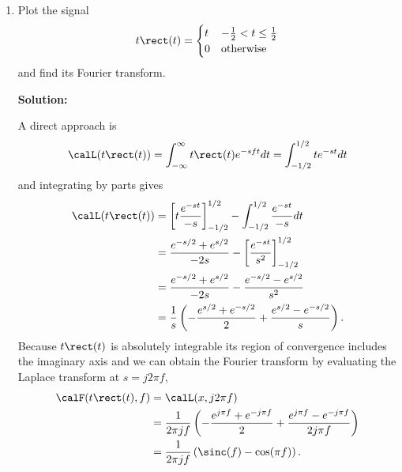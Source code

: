 \documentclass[11pt,a4paper]{book}
\theoremstyle{plain}
\numberwithin{equation}{section}
\newcommand{\vtick}[1]{\draw (#1,-0.075) -- (#1,0.075) }
\newcommand{\htick}[1]{\draw (-0.075,#1) -- (0.075,#1)}
\newenvironment{solution}{\begin{footnotesize}\textbf{Solution:}}{\end{footnotesize}}
\newenvironment{excersizelist}{%
  \renewcommand*{\theenumi}{\thechapter.\arabic{enumi}}%
  \newcommand\itemadvanced{\stepcounter{enumi}\item[$\ast$\, \theenumi.]}
  \begin{enumerate}
}{%
  \end{enumerate}
}
\begin{document}
\begin{excersizelist}
\item Plot the signal
\[
t\rect(t) = \begin{cases}
t & -\tfrac{1}{2} < t \leq \tfrac{1}{2} \\
0 & \text{otherwise}
\end{cases}
\] 
and find its Fourier transform.
\begin{solution}
\begin{center}
\end{center}

A direct approach is
\[
\calL( t \rect(t) ) = \int_{-\infty}^\infty t \rect(t) e^{-s f t} dt = \int_{-1/2}^{1/2} t e^{-s t} dt 
\]
and integrating by parts gives
\begin{align*}
\calL( t \rect(t) ) &= \left[ t \frac{e^{-s t}}{-s} \right]_{-1/2}^{1/2}  - \int_{-1/2}^{1/2} \frac{e^{-s t}}{-s}  dt \\
&= \frac{e^{-s/2} + e^{s/2}}{-2s} - \left[ \frac{e^{-st}}{s^2} \right]_{-1/2}^{1/2}  \\
&= \frac{e^{-s/2} + e^{s/2}}{-2s} - \frac{e^{-s/2} - e^{s/2}}{s^2}  \\
&= \frac{1}{s}\left( -\frac{e^{s/2} + e^{-s/2}}{2} + \frac{e^{s/2} - e^{-s/2}}{s} \right) .
\end{align*}
Because $t \rect(t)$ is absolutely integrable its region of convergence includes the imaginary axis and we can obtain the Fourier transform by evaluating the Laplace transform at $s = j2\pi f$, 
\begin{align*}
\calF( t \rect(t), f) &= \calL(x, j 2\pi f) \\
&= \frac{1}{2\pi j f}\left( -\frac{e^{j \pi f} + e^{-j\pi f}}{2} + \frac{e^{j\pi f} - e^{-j \pi f}}{2 j \pi f } \right) \\
&= \frac{1}{2\pi j f}\left( \sinc(f) - \cos(\pi f)\right) .
\end{align*}


\end{solution}
\end{excersizelist}
\end{document}
